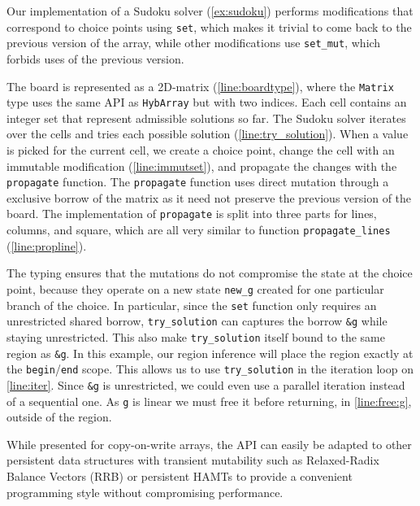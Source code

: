 Our implementation of a Sudoku solver (\cref{ex:sudoku}) performs
modifications that correspond to choice points using \lstinline/set/,
which makes it trivial to come back to the previous version
of the array, while other modifications use \lstinline/set_mut/, which
forbids uses of the previous version.

The board is represented as a 2D-matrix (\cref{line:boardtype}), where
the \lstinline/Matrix/ type uses the same API as \lstinline/HybArray/
but with two indices.
Each cell contains an integer set that represent admissible solutions so far.
The Sudoku solver iterates over the cells and tries each possible solution (\cref{line:try_solution}).
When a value is picked for the current cell, we create a choice point,
change the cell with an immutable modification (\cref{line:immutset}), and propagate
the changes with the \lstinline/propagate/ function.
The \lstinline/propagate/ function uses direct mutation through a
exclusive borrow of the matrix as it need not preserve the previous
version of the board.
The implementation of \lstinline/propagate/ is split into three parts
for lines, columns, and square, which are all very similar to function
\lstinline/propagate_lines/ (\cref{line:propline}).

The typing ensures that the mutations do not compromise the state at
the choice point, because they operate on a new state \lstinline/new_g/ created for one
particular branch of the choice.
In particular,
since the \lstinline/set/ function only requires an unrestricted shared borrow,
\lstinline/try_solution/ can captures the borrow \lstinline/&g/
while staying unrestricted.
This also make \lstinline/try_solution/ itself bound to the same
region as \lstinline/&g/. In this example, our region inference
will place the region exactly at the \lstinline/begin//\lstinline/end/
scope.
This allows us to use \lstinline/try_solution/ in
the iteration loop on \cref{line:iter}.
Since \lstinline/&g/ is unrestricted, we could even use a parallel iteration
instead of a sequential one.
As \lstinline/g/ is linear we must free it before returning,
in \cref{line:free:g}, outside of the region.

While presented for copy-on-write arrays, the API
can easily be adapted to other persistent data structures with
transient mutability such as Relaxed-Radix Balance Vectors (RRB) \cite{DBLP:journals/pacmpl/Puente17}
or persistent HAMTs \cite{bagwell2001ideal,clojurehamt} to provide  a
convenient programming style without compromising performance.


